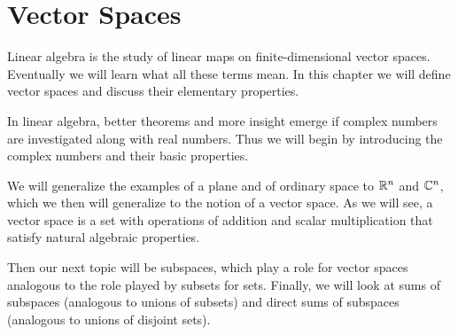 \chapter{Vector Spaces}

Linear algebra is the study of linear maps on finite-dimensional vector spaces.
Eventually we will learn what all these terms mean. In this chapter we will
define vector spaces and discuss their elementary properties.

In linear algebra, better theorems and more insight emerge if complex numbers
are investigated along with real numbers. Thus we will begin by introducing the
complex numbers and their basic properties.

We will generalize the examples of a plane and of ordinary space to $\mathbb{R}^n$ and
$\mathbb{C}^n$, which we then will generalize to the notion of a vector space. As we
will see, a vector space is a set with operations of addition and scalar
multiplication that satisfy natural algebraic properties.

Then our next topic will be subspaces, which play a role for vector spaces
analogous to the role played by subsets for sets. Finally, we will look at sums
of subspaces (analogous to unions of subsets) and direct sums of subspaces
(analogous to unions of disjoint sets).
